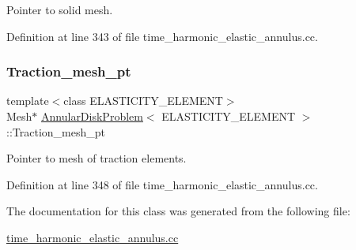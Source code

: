 Pointer to solid mesh. 



Definition at line 343 of file time\+\_\+harmonic\+\_\+elastic\+\_\+annulus.\+cc.

\mbox{\label{classAnnularDiskProblem_ac35f917b7678de36c2942530fc9ba4d6}} 
\subsubsection{\texorpdfstring{Traction\+\_\+mesh\+\_\+pt}{Traction\_mesh\_pt}}
{\footnotesize\ttfamily template$<$class E\+L\+A\+S\+T\+I\+C\+I\+T\+Y\+\_\+\+E\+L\+E\+M\+E\+NT$>$ \\
Mesh$\ast$ \hyperlink{classAnnularDiskProblem}{Annular\+Disk\+Problem}$<$ E\+L\+A\+S\+T\+I\+C\+I\+T\+Y\+\_\+\+E\+L\+E\+M\+E\+NT $>$\+::Traction\+\_\+mesh\+\_\+pt\hspace{0.3cm}{\ttfamily [private]}}



Pointer to mesh of traction elements. 



Definition at line 348 of file time\+\_\+harmonic\+\_\+elastic\+\_\+annulus.\+cc.



The documentation for this class was generated from the following file\+:\begin{DoxyCompactItemize}
\item 
\hyperlink{time__harmonic__elastic__annulus_8cc}{time\+\_\+harmonic\+\_\+elastic\+\_\+annulus.\+cc}\end{DoxyCompactItemize}
